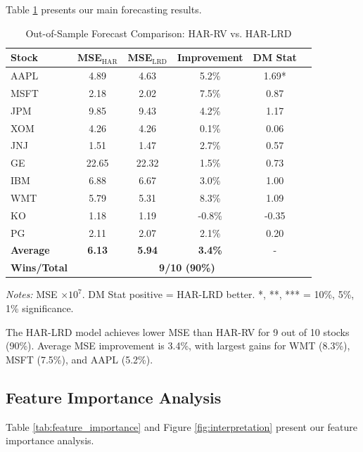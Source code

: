 \documentclass[12pt,a4paper]{article}
\begin{document}
Table \ref{tab:model_comparison} presents our main forecasting results.

\begin{table}[H]
\centering
\caption{Out-of-Sample Forecast Comparison: HAR-RV vs. HAR-LRD}
\label{tab:model_comparison}
\small
\begin{tabular}{lccccc}
\toprule
Stock & MSE$_{\text{HAR}}$ & MSE$_{\text{LRD}}$ & Improvement & DM Stat \\
\midrule
AAPL & 4.89 & 4.63 & 5.2\% & 1.69* \\
MSFT & 2.18 & 2.02 & 7.5\% & 0.87 \\
JPM & 9.85 & 9.43 & 4.2\% & 1.17 \\
XOM & 4.26 & 4.26 & 0.1\% & 0.06 \\
JNJ & 1.51 & 1.47 & 2.7\% & 0.57 \\
GE & 22.65 & 22.32 & 1.5\% & 0.73 \\
IBM & 6.88 & 6.67 & 3.0\% & 1.00 \\
WMT & 5.79 & 5.31 & 8.3\% & 1.09 \\
KO & 1.18 & 1.19 & -0.8\% & -0.35 \\
PG & 2.11 & 2.07 & 2.1\% & 0.20 \\
\midrule
\textbf{Average} & \textbf{6.13} & \textbf{5.94} & \textbf{3.4\%} & - \\
\textbf{Wins/Total} & \multicolumn{4}{c}{\textbf{9/10 (90\%)}} \\
\bottomrule
\end{tabular}
\begin{tablenotes}\small
\item \textit{Notes:} MSE $\times 10^7$. DM Stat positive = HAR-LRD better. *, **, *** = 10\%, 5\%, 1\% significance.
\end{tablenotes}
\end{table}

The HAR-LRD model achieves lower MSE than HAR-RV for 9 out of 10 stocks (90\%). Average MSE improvement is 3.4\%, with largest gains for WMT (8.3\%), MSFT (7.5\%), and AAPL (5.2\%).

\subsection{Feature Importance Analysis}

Table \ref{tab:feature_importance} and Figure \ref{fig:interpretation} present our feature importance analysis.
\end{document}
